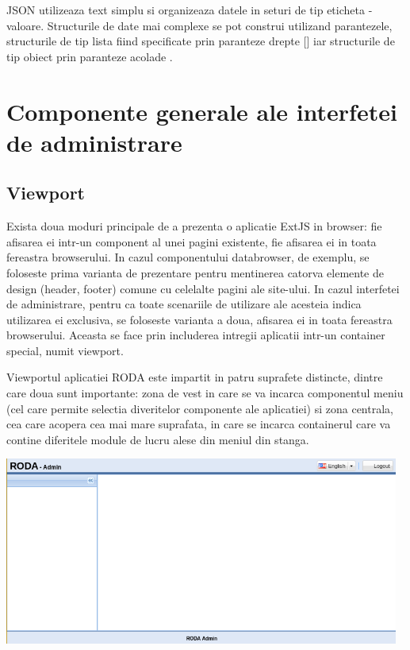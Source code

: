 JSON utilizeaza text simplu si organizeaza datele in seturi de tip eticheta - valoare. Structurile de date mai complexe se pot construi utilizand parantezele, structurile de tip lista fiind specificate prin paranteze drepte [] iar structurile de tip obiect prin paranteze acolade {}. 


\section{Componente generale ale interfetei de administrare}

\subsection{Viewport}

Exista doua moduri principale de a prezenta o aplicatie ExtJS in browser: fie afisarea ei intr-un component al unei pagini existente, fie afisarea ei in toata fereastra browserului. In cazul componentului databrowser, de exemplu, se foloseste prima varianta de prezentare pentru mentinerea catorva elemente de design (header, footer) comune cu celelalte pagini ale site-ului. In cazul interfetei de administrare, pentru ca toate scenariile de utilizare ale acesteia indica utilizarea ei exclusiva, se foloseste varianta a doua, afisarea ei in toata fereastra browserului. Aceasta se face prin includerea intregii aplicatii intr-un container special, numit viewport. 

Viewportul aplicatiei RODA este impartit in patru suprafete distincte, dintre care doua sunt importante: zona de vest in care se va incarca componentul meniu (cel care permite selectia diveritelor componente ale aplicatiei) si zona centrala, cea care acopera cea mai mare suprafata, in care se incarca containerul care va contine diferitele module de lucru alese din meniul din stanga. 

\includegraphics[width=13cm]{img/viewport}

